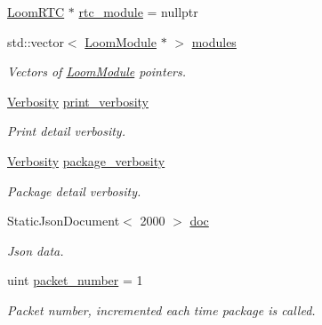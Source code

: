 \begin{DoxyCompactItemize}
\hyperlink{class_loom_r_t_c}{Loom\+R\+TC} $\ast$ \hyperlink{class_loom_manager_a5ff1841a189242d33d2f0ff313e8a74a}{rtc\+\_\+module} = nullptr
\item 
std\+::vector$<$ \hyperlink{class_loom_module}{Loom\+Module} $\ast$ $>$ \hyperlink{class_loom_manager_a2880117fb788e2210560e87ed655cb8e}{modules}
\begin{DoxyCompactList}\small\item\em Vectors of \hyperlink{class_loom_module}{Loom\+Module} pointers. \end{DoxyCompactList}\item 
\hyperlink{_misc_8h_abf3be10d03894afb391f3a2935e3b313}{Verbosity} \hyperlink{class_loom_manager_a00b6fc4d662e25ea1b88a427909b8a94}{print\+\_\+verbosity}
\begin{DoxyCompactList}\small\item\em Print detail verbosity. \end{DoxyCompactList}\item 
\hyperlink{_misc_8h_abf3be10d03894afb391f3a2935e3b313}{Verbosity} \hyperlink{class_loom_manager_a7e57c09ed534c554f96c457127294f20}{package\+\_\+verbosity}
\begin{DoxyCompactList}\small\item\em Package detail verbosity. \end{DoxyCompactList}\item 
Static\+Json\+Document$<$ 2000 $>$ \hyperlink{class_loom_manager_ac1b761a5c37d853db374c13a1cb3226c}{doc}
\begin{DoxyCompactList}\small\item\em Json data. \end{DoxyCompactList}\item 
uint \hyperlink{class_loom_manager_a7537185cd89f2b472d338268fa2418c9}{packet\+\_\+number} = 1
\begin{DoxyCompactList}\small\item\em Packet number, incremented each time package is called. \end{DoxyCompactList}\end{DoxyCompactItemize}
